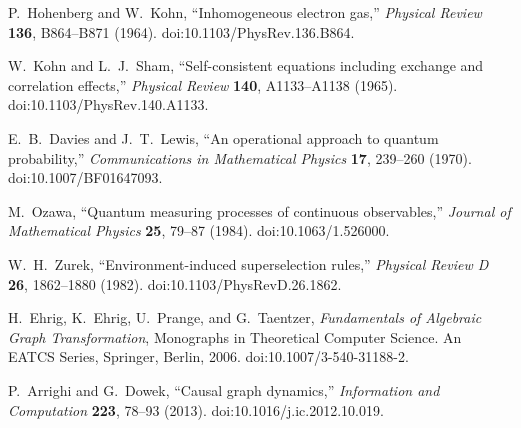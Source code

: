 \documentclass[10pt,twoside,a5paper]{article}
\theoremstyle{definition}
\begin{document}
\begin{eref}
P.~Hohenberg and W.~Kohn,
``Inhomogeneous electron gas,''
\emph{Physical Review} \textbf{136}, B864--B871 (1964).
doi:10.1103/PhysRev.136.B864.

W.~Kohn and L.~J.~Sham,
``Self-consistent equations including exchange and correlation effects,''
\emph{Physical Review} \textbf{140}, A1133--A1138 (1965).
doi:10.1103/PhysRev.140.A1133.

E.~B.~Davies and J.~T.~Lewis,
``An operational approach to quantum probability,''
\emph{Communications in Mathematical Physics} \textbf{17}, 239--260 (1970).
doi:10.1007/BF01647093.

M.~Ozawa,
``Quantum measuring processes of continuous observables,''
\emph{Journal of Mathematical Physics} \textbf{25}, 79--87 (1984).
doi:10.1063/1.526000.

W.~H.~Zurek,
``Environment-induced superselection rules,''
\emph{Physical Review D} \textbf{26}, 1862--1880 (1982).
doi:10.1103/PhysRevD.26.1862.

H.~Ehrig, K.~Ehrig, U.~Prange, and G.~Taentzer,
\textit{Fundamentals of Algebraic Graph Transformation},
Monographs in Theoretical Computer Science. An EATCS Series,
Springer, Berlin, 2006.
doi:10.1007/3-540-31188-2.

P.~Arrighi and G.~Dowek,
``Causal graph dynamics,''
\textit{Information and Computation} \textbf{223}, 78--93 (2013).
doi:10.1016/j.ic.2012.10.019.

\end{eref}
\end{document}
